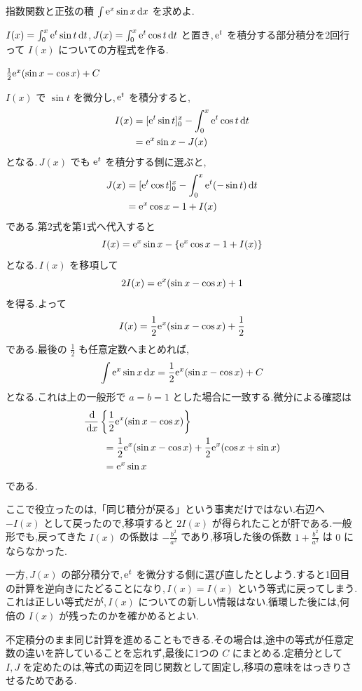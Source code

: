 \begin{example}{指数関数と正弦の積}
$\int\mathrm{e}^x\sin x\,\mathrm{d} x$ を求めよ.
\end{example}

$I(x)=\int_0^x\mathrm{e}^t\sin t\,\mathrm{d} t$,\,$J(x)=\int_0^x\mathrm{e}^t\cos t\,\mathrm{d} t$ と置き,\,$\mathrm{e}^t$ を積分する部分積分を2回行って $I(x)$ についての方程式を作る.

$\frac12\mathrm{e}^x(\sin x-\cos x)+C$

$I(x)$ で $\sin t$ を微分し,\,$\mathrm{e}^t$ を積分すると,
\[
\begin{aligned}
 I(x)
 &=[\mathrm{e}^t\sin t]_0^x-\int_0^x\mathrm{e}^t\cos t\,\mathrm{d} t\\
 &=\mathrm{e}^x\sin x-J(x)
\end{aligned}
\]
となる.\,$J(x)$ でも $\mathrm{e}^t$ を積分する側に選ぶと,
\[
\begin{aligned}
 J(x)
 &=[\mathrm{e}^t\cos t]_0^x-\int_0^x\mathrm{e}^t(-\sin t)\,\mathrm{d} t\\
 &=\mathrm{e}^x\cos x-1+I(x)
\end{aligned}
\]
である.第2式を第1式へ代入すると
\[
 I(x)
 =\mathrm{e}^x\sin x-\{\mathrm{e}^x\cos x-1+I(x)\}
\]
となる.\,$I(x)$ を移項して
\[
 2I(x)=\mathrm{e}^x(\sin x-\cos x)+1
\]
を得る.よって
\[
 I(x)=\frac12\mathrm{e}^x(\sin x-\cos x)+\frac12
\]
である.最後の $\frac12$ も任意定数へまとめれば,
\[
 \int\mathrm{e}^x\sin x\,\mathrm{d} x
 =\frac12\mathrm{e}^x(\sin x-\cos x)+C
\]
となる.これは上の一般形で $a=b=1$ とした場合に一致する.微分による確認は
\[
\begin{aligned}
 &\frac{\,\mathrm{d}}{\,\mathrm{d} x}\left\{\frac12\mathrm{e}^x(\sin x-\cos x)\right\}\\
 &\qquad=\frac12\mathrm{e}^x(\sin x-\cos x)
 +\frac12\mathrm{e}^x(\cos x+\sin x)\\
 &\qquad=\mathrm{e}^x\sin x
\end{aligned}
\]
である.

ここで役立ったのは,「同じ積分が戻る」という事実だけではない.右辺へ $-I(x)$ として戻ったので,移項すると $2I(x)$ が得られたことが肝である.一般形でも,戻ってきた $I(x)$ の係数は $-\frac{b^2}{a^2}$ であり,移項した後の係数 $1+\frac{b^2}{a^2}$ は $0$ にならなかった.

一方,\,$J(x)$ の部分積分で,\,$\mathrm{e}^t$ を微分する側に選び直したとしよう.すると1回目の計算を逆向きにたどることになり,\,$I(x)=I(x)$ という等式に戻ってしまう.これは正しい等式だが,\,$I(x)$ についての新しい情報はない.循環した後には,何倍の $I(x)$ が残ったのかを確かめるとよい.

不定積分のまま同じ計算を進めることもできる.その場合は,途中の等式が任意定数の違いを許していることを忘れず,最後に1つの $C$ にまとめる.定積分として $I,J$ を定めたのは,等式の両辺を同じ関数として固定し,移項の意味をはっきりさせるためである.
